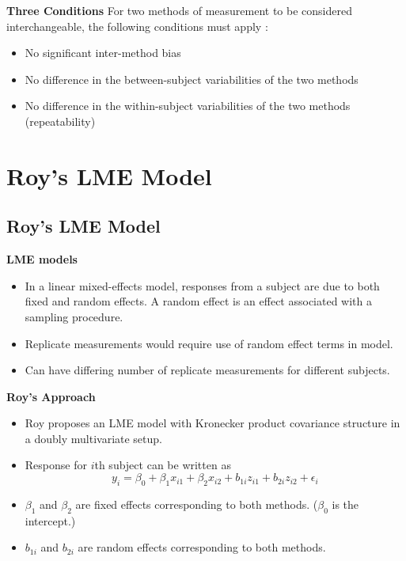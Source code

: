 \documentclass[compress]{beamer}        %
\makeatletter
\newcommand{\tcb}{\textcolor{beamer@blendedblue}}
\makeatother
\begin{document}
		
		\begin{frame}{\bf \tcb{Three Conditions}}
			\Large
			For two methods of measurement to be considered interchangeable, the following conditions must apply \cite{Roy2009}:
			\\
			\begin{itemize}\itemsep0.5cm
				\item No significant inter-method bias
				\item No difference in the between-subject variabilities of the two methods
				\item No difference in the within-subject variabilities of the two methods (repeatability)
			\end{itemize}
		\end{frame}
		
		\section[Roy's LME Model]{Roy's LME Model}
		\subsection{Roy's LME Model}
		\begin{frame}{\bf \tcb{LME models}}
						\Large
			\begin{itemize}\itemsep0.7cm
				\item In a linear mixed-effects model, responses from a subject are due to both fixed and random
				effects. A random effect is an effect associated with a sampling procedure.
				\item Replicate measurements would require use of random effect terms in model.
				\item Can have differing number of replicate measurements for different subjects.
			\end{itemize}
		\end{frame}
		\begin{frame}{\bf \tcb{Roy's Approach}}
						\large
			\begin{itemize}\itemsep0.7cm
				\item Roy proposes an LME model with Kronecker product covariance structure in a doubly multivariate setup.
				\item Response for $i$th subject can be written as
				\[ y_i = \beta_0 + \beta_1x_{i1} + \beta_2x_{i2} + b_{1i}z_{i1}  + b_{2i}z_{i2} + \epsilon_i \]
				\item $\beta_1$ and $\beta_2$ are fixed effects corresponding to both methods. ($\beta_0$ is the intercept.)
				\item $b_{1i}$ and $b_{2i}$ are random effects corresponding to both methods.
			\end{itemize}
		\end{frame}
		
\end{document}
